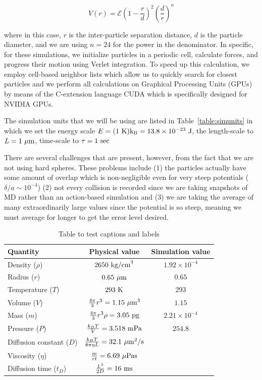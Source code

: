 \documentclass[twocolumn,amsmath,amssymb]{revtex4}
\begin{document}
\begin{equation}
    V(r) = \mathcal{E} \left(1 - \frac{r}{d}\right)^2 \left(\frac{d}{r}\right)^n
\end{equation}

where in this case, $r$ is the inter-particle separation distance, $d$ is the
particle diameter, and we are using $n = 24$ for the power in the denominator.
In specific, for these simulations, we initialize particles in a periodic cell,
calculate forces, and progress their motion using Verlet integration.  To speed
up this calculation, we employ cell-based neighbor lists which allow us to
quickly search for closest particles and we perform all calculations on
Graphical Processing Units (GPUs) by means of the C-extension language CUDA
which is specifically designed for NVIDIA GPUs.

The simulation units that we will be using are listed in
Table~\ref{table:simunits} in which we set the energy scale $E = (1~\rm{K}) k_B
= 13.8\times10^{-23}~\rm{J}$, the length-scale to $L = 1~\rm{\mu m}$,
time-scale to $\tau = 1~\rm{sec}$

There are several challenges that are present, however, from the fact that we
are not using hard spheres.  These problems include (1) the particles actually
have some amount of overlap which is non-negligible even for very steep
potentials ($\delta/a \sim 10^{-4}$) (2) not every collision is recorded since
we are taking snapshots of MD rather than an action-based simulation and (3) we
are taking the average of many extraordinarily large values since the potential
is so steep, meaning we must average for longer to get the error level desired.

\begin{table}
\centering
\begin{tabular}{||l c c||}
    \hline
    Quantity & Physical value & Simulation value  \\ \hline\hline
    Density ($\rho$)    & $2650~\rm{kg/cm}^3$                       & $1.92\times10^{-4}$ \\ \hline
    Radius ($r$)        & $0.65~\rm{\mu m}$                         & $0.65$ \\ \hline
    Temperature ($T$)   & $293~\rm{K}$                              & $293$  \\  \hline
    Volume ($V$)        & $\frac{4\pi}{3}r^3 = 1.15~\rm{\mu m}^3$   & $1.15$ \\ \hline
    Mass ($m$)          & $\frac{4\pi}{3}r^3 \rho = 3.05~\rm{pg}$   & $2.21\times10^{-4}$ \\  \hline
    Pressure ($P$)      & $\frac{k_B T}{V} = 3.518~\rm{mPa}$        & $254.8$   \\  \hline
    Diffusion constant ($D$) & $\frac{k_B T}{6\pi \eta L} = 32.1~\rm{\mu m^2/s}$ & \\  \hline
    Viscosity ($\eta$)  & $\frac{m}{r t} = 6.69~\mu\rm{Pa s}$ & \\  \hline
    Diffusion time ($t_D$)   & $\frac{L^2}{2D} = 16~\rm{ms}$ & \\  \hline
\end{tabular}
\caption{Table to test captions and labels}
\label{table:simvalues}
\end{table}
\end{document}
